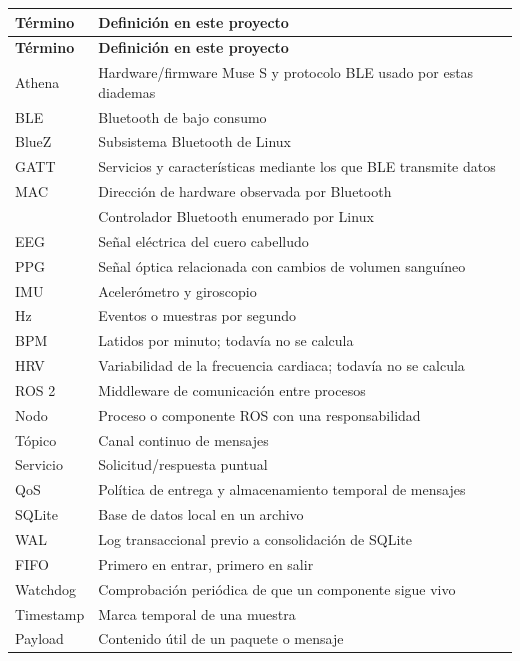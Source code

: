 \documentclass[11pt,a4paper]{article}
\begin{document}
\begin{longtable}{@{}>{\raggedright\arraybackslash}p{}>{\raggedright\arraybackslash}p{}@{}}
\toprule
\textbf{Término} & \textbf{Definición en este proyecto} \\
\midrule
\endfirsthead
\toprule
\textbf{Término} & \textbf{Definición en este proyecto} \\
\midrule
\endhead
Athena & Hardware/firmware Muse S y protocolo BLE usado por estas diademas \\
BLE & Bluetooth de bajo consumo \\
BlueZ & Subsistema Bluetooth de Linux \\
GATT & Servicios y características mediante los que BLE transmite datos \\
MAC & Dirección de hardware observada por Bluetooth \\
{\ttfamily\small hciN} & Controlador Bluetooth enumerado por Linux \\
EEG & Señal eléctrica del cuero cabelludo \\
PPG & Señal óptica relacionada con cambios de volumen sanguíneo \\
IMU & Acelerómetro y giroscopio \\
Hz & Eventos o muestras por segundo \\
BPM & Latidos por minuto; todavía no se calcula \\
HRV & Variabilidad de la frecuencia cardiaca; todavía no se calcula \\
ROS 2 & Middleware de comunicación entre procesos \\
Nodo & Proceso o componente ROS con una responsabilidad \\
Tópico & Canal continuo de mensajes \\
Servicio & Solicitud/respuesta puntual \\
QoS & Política de entrega y almacenamiento temporal de mensajes \\
SQLite & Base de datos local en un archivo \\
WAL & Log transaccional previo a consolidación de SQLite \\
FIFO & Primero en entrar, primero en salir \\
Watchdog & Comprobación periódica de que un componente sigue vivo \\
Timestamp & Marca temporal de una muestra \\
Payload & Contenido útil de un paquete o mensaje \\
\bottomrule
\end{longtable}
\end{document}
